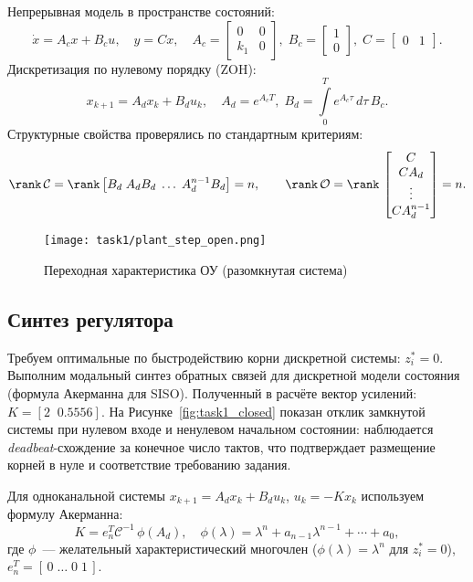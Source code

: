 Непрерывная модель в пространстве состояний:
\[\label{eq:cont_model}
\dot x = A_c x + B_c u,\quad y = C x,\quad 
A_c = \begin{bmatrix}0 & 0\\ k_1 & 0\end{bmatrix},\; B_c = \begin{bmatrix}1\\0\end{bmatrix},\; C=\begin{bmatrix}0 & 1\end{bmatrix}.
\]
Дискретизация по нулевому порядку (ZOH):
\[\label{eq:disc_model}
 x_{k+1} = A_d x_k + B_d u_k,\quad A_d = e^{A_c T},\; B_d = \int\limits_0^{T} e^{A_c \tau}\, d\tau\, B_c.
\]
Структурные свойства проверялись по стандартным критериям: 
\[\rank\, \mathcal C = \rank\,\bigl[ B_d\; A_d B_d\; \dots \; A_d^{n-1} B_d \bigr] = n,\qquad 
\rank\, \mathcal O = \rank\,\begin{bmatrix} C\\ C A_d \\ \vdots \\ C A_d^{n-1}\end{bmatrix}= n.
\]

\begin{figure}[H]
    \centering
    \texttt{[image: task1/plant\_step\_open.png]}
    \caption{Переходная характеристика ОУ (разомкнутая система)}
    \label{fig:task1_open}
\end{figure}

\subsection{Синтез регулятора}
Требуем оптимальные по быстродействию корни дискретной системы: $z_i^*=0$. Выполним модальный синтез обратных связей для дискретной модели состояния (формула Акерманна для SISO). Полученный в расчёте вектор усилений: $K=[2\;\;0.5556]$. На Рисунке~\ref{fig:task1_closed} показан отклик замкнутой системы при нулевом входе и ненулевом начальном состоянии: наблюдается \textit{deadbeat}-схождение за конечное число тактов, что подтверждает размещение корней в нуле и соответствие требованию задания.

Для одноканальной системы $x_{k+1}=A_d x_k + B_d u_k$, $u_k=-Kx_k$ используем формулу Акерманна:
\[\label{eq:ack}
K = e_n^T \mathcal C^{-1}\, \phi(A_d),\quad \phi(\lambda)=\lambda^{n}+a_{n-1}\lambda^{n-1}+\cdots+a_0,
\]
где $\phi$~--- желательный характеристический многочлен ($\phi(\lambda)=\lambda^n$ для $z_i^*=0$), $e_n^T = [\,0\;\dots\;0\;1\,]$.

